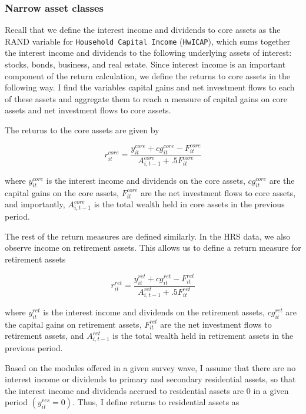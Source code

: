  \subsubsection{Narrow asset classes}
 
\par Recall that we define the interest income and dividends to core assets as the RAND variable for \texttt{Household Capital Income} (\texttt{HwICAP}), which sums together the interest income and dividends to the following underlying assets of interest: stocks, bonds, business, and real estate. Since interest income is an important component of the return calculation, we define the returns to core assets in the following way. I find the variables capital gains and net investment flows to each of these assets and aggregate them to reach a measure of capital gains on core assets and net investment flows to core assets.  

\par The returns to the core assets are given by

$$ r^{core}_{it} = \frac{y^{core}_{it} + cg^{core}_{it} - F^{core}_{it}}{A^{core}_{i,t-1} + .5F^{core}_{it}}   $$

where $y^{core}_{it}$ is the interest income and dividends on the core assets, $cg^{core}_{it}$ are the capital gains on the core assets, $F^{core}_{it}$ are the net investment flows to core assets, and importantly, $A^{core}_{i,t-1}$ is the total wealth held in core assets in the previous period.

\par The rest of the return measures are defined similarly. In the HRS data, we also observe income on retirement assets. This allows us to define a return measure for retirement assets

$$ r^{ret}_{it} = \frac{y^{ret}_{it} + cg^{ret}_{it} - F^{ret}_{it}}{A^{ret}_{i,t-1} + .5F^{ret}_{it}}   $$

where $y^{ret}_{it}$ is the interest income and dividends on the retirement assets, $cg^{ret}_{it}$ are the capital gains on retirement assets, $F^{ret}_{it}$ are the net investment flows to retirement assets, and $A^{ret}_{i,t-1}$ is the total wealth held in retirement assets in the previous period.

\par Based on the modules offered in a given survey wave, I assume that there are no interest income or dividends to primary and secondary residential assets, so that the interest income and dividends accrued to residential assets are 0 in a given period $(y^{res}_{it}=0)$. Thus, I define returns to residential assets as

